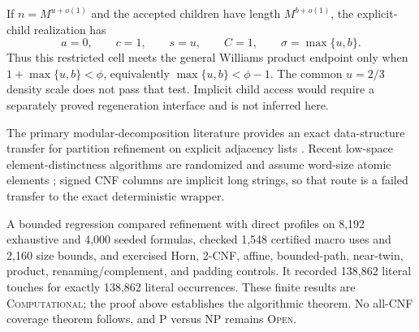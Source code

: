 If $n=M^{u+o(1)}$ and the accepted children have length
$M^{b+o(1)}$, the explicit-child realization has
\[
 a=0,\qquad c=1,\qquad s=u,\qquad
 C=1,\qquad \sigma=\max\{u,b\}.
\]
Thus this restricted cell meets the general Williams product endpoint only
when $1+\max\{u,b\}<\phi$, equivalently
$\max\{u,b\}<\phi-1$.  The common $u=2/3$ density scale does not pass that
test.  Implicit child access would require a separately proved regeneration
interface and is not inferred here.

The primary modular-decomposition literature provides an exact data-structure
transfer for partition refinement on explicit adjacency lists
\cite{arc0009McConnellSpinrad}.  Recent low-space element-distinctness
algorithms are randomized and assume word-size atomic elements
\cite{arc0009LyuZhu}; signed CNF columns are implicit long strings, so that
route is a failed transfer to the exact deterministic wrapper.

A bounded regression compared refinement with direct profiles on 8,192
exhaustive and 4,000 seeded formulas, checked 1,548 certified macro uses and
2,160 size bounds, and exercised Horn, 2-CNF, affine, bounded-path,
near-twin, product, renaming/complement, and padding controls.  It recorded
138,862 literal touches for exactly 138,862 literal occurrences.  These
finite results are \textsc{Computational}; the proof above establishes the
algorithmic theorem.  No all-CNF coverage theorem follows, and P versus NP
remains \textsc{Open}.
